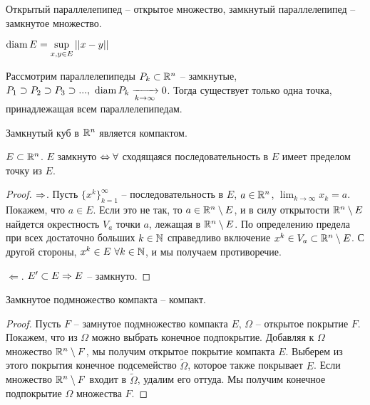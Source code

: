     \begin{Ex}
        Открытый параллелепипед -- открытое множество, замкнутый параллелепипед -- замкнутое множество.
    \end{Ex}

    \begin{Def}
        $\displaystyle \operatorname{diam} E = \sup_{x, y \in E} ||x - y||$ 
    \end{Def}

    \begin{Thm}
        Рассмотрим параллелепипеды $P_k \subset \mathbb{R}^n$ -- замкнутые, $P_1 \supset P_2 \supset P_3 \supset ..., \ \operatorname{diam} P_k \xrightarrow[k \to \infty]{}0$.
        Тогда существует только одна точка, принадлежащая всем параллелепипедам.
    \end{Thm}

    \begin{Thm}
        Замкнутый куб в $\mathbb{R}^n$ является компактом.
    \end{Thm}

    \begin{Lm}
        $E \subset \mathbb{R}^n$. $E$ замкнуто $\Leftrightarrow \forall$ сходящаяся последовательность в $E$ имеет пределом точку из $E$. 
    \end{Lm}

    \begin{proof}
        $\Rightarrow$. Пусть $\{x^k\}_{k = 1}^\infty$ -- последовательность в $E$, $a \in \mathbb{R}^n$, $\lim_{k \to \infty} x_k = a$. Покажем, что $a \in E$.
        Если это не так, то $a \in \mathbb{R}^n \setminus E$, и в силу открытости $\mathbb{R}^n \setminus E$ найдется окрестность $V_a$ точки $a$, лежащая в $\mathbb{R}^n \setminus E$. 
        По определению предела при всех достаточно больших $k \in \mathbb{N}$ справедливо включение $x^k \in V_a \subset \mathbb{R}^n \setminus E$. С другой стороны, $x^k \in E \ \forall k \in \mathbb{N}$, и мы получаем противоречие. 

        $\Leftarrow$. $E' \subset E \Rightarrow E$ -- замкнуто.
    \end{proof}

    \begin{Lm}
        Замкнутое подмножество компакта -- компакт.
    \end{Lm}

    \begin{proof}
        Пусть $F$ -- замнутое подмножество компакта $E$, $\Omega$ -- открытое покрытие $F$. Покажем, что из $\Omega$ можно выбрать конечное подпокрытие.
        Добавляя к $\Omega$ множество $\mathbb{R}^n \setminus F$, мы получим открытое покрытие компакта $E$. Выберем из этого покрытия конечное подсемейство $\widetilde{\Omega}$, которое также покрывает $E$.
        Если множество $\mathbb{R}^n \setminus F$ входит в $\widetilde{\Omega}$, удалим его оттуда. Мы получим конечное подпокрытие $\Omega$ множества $F$. 
    \end{proof}

